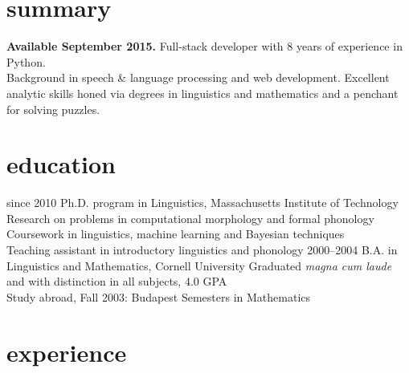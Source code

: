 \documentclass[]{friggeri-cv}
\begin{document}
\section{summary}

\textbf{Available September 2015.} Full-stack developer with 8 years of experience in Python. \\ Background in speech \& language processing and web development. Excellent analytic skills honed via degrees in linguistics and mathematics and a penchant for solving puzzles.

\section{education}

\begin{entrylist}
  \entry
    {since 2010}
    {Ph.D. program in Linguistics, Massachusetts Institute of Technology}
    {}
    {%
     \Squaredot Research on problems in computational morphology and formal phonology \\
     \Squaredot Coursework in linguistics, machine learning and Bayesian techniques   \\
     \Squaredot Teaching assistant in introductory linguistics and phonology
    }
  \entry
    {2000--2004}
    {B.A. in Linguistics and Mathematics, Cornell University}
    {}
    {
    \Squaredot Graduated \emph{magna cum laude} and with distinction in all subjects, 4.0 GPA \\
	\Squaredot Study abroad, Fall 2003: Budapest Semesters in Mathematics}
\end{entrylist}

\section{experience}
\end{document}
